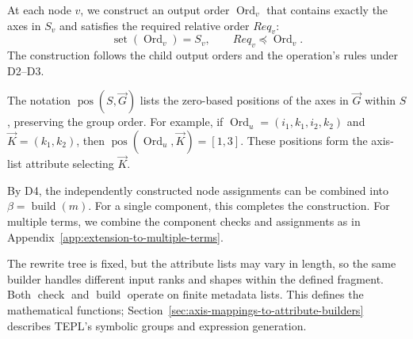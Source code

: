 At each node $v$, we construct an output order $\operatorname{Ord}_v$
that contains exactly the axes in $S_v$ and satisfies the required
relative order $Req_v$:
\begin{equation}
 \operatorname{set}(\operatorname{Ord}_v)=S_v,
 \qquad Req_v\preceq\operatorname{Ord}_v.
 \label{eq:order-invariant}
\end{equation}
The construction follows the child output orders and the operation's
rules under D2--D3. 

The notation $\operatorname{pos}(S,\vec G)$ lists the zero-based positions
of the axes in $\vec G$ within $S$, preserving the group order.
For example, if $\operatorname{Ord}_u=(i_1,k_1,i_2,k_2)$ and
$\vec K=(k_1,k_2)$, then
$\operatorname{pos}(\operatorname{Ord}_u,\vec K)=[1,3]$.
These positions form the axis-list attribute selecting $\vec K$.

By D4, the independently constructed node assignments can be combined
into $\beta=\operatorname{build}(m)$. For a single component, this completes
the construction. For multiple terms, we combine the component checks and
assignments as in Appendix~\ref{app:extension-to-multiple-terms}.

The rewrite tree is fixed, but the
attribute lists may vary in length, so the same builder handles different
input ranks and shapes within the defined fragment. Both $\operatorname{check}$
and $\operatorname{build}$ operate on finite metadata lists.
This defines the mathematical functions; Section~\ref{sec:axis-mappings-to-attribute-builders}
describes TEPL's symbolic groups and expression generation.
